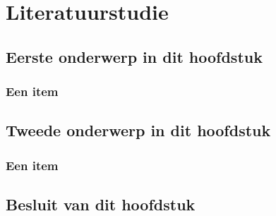 \chapter{Literatuurstudie}
\label{hoofdstuk:literature}

\section{Eerste onderwerp in dit hoofdstuk}

\subsection{Een item}

\section{Tweede onderwerp in dit hoofdstuk}

\subsection{Een item}

\section{Besluit van dit hoofdstuk}

